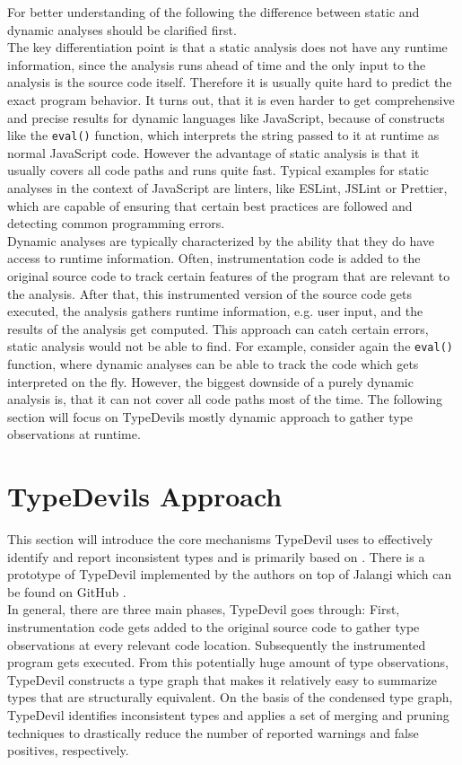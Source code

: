 \documentclass[runningheads,a4paper]{llncs}
\begin{document}
For better understanding of the following the difference between static and dynamic analyses should be clarified first.\\
The key differentiation point is that a static analysis does not have any runtime information, since the analysis runs ahead of time and the only input to the analysis is the source code itself.
Therefore it is usually quite hard to predict the exact program behavior.
It turns out, that it is even harder to get comprehensive and precise results for dynamic languages like JavaScript, because of constructs like the \lstinline[columns=fixed]{eval()} function, which interprets the string passed to it at runtime as normal JavaScript code. 
However the advantage of static analysis is that it usually covers all code paths and runs quite fast.
Typical examples for static analyses in the context of JavaScript are linters, like ESLint, JSLint or Prettier, which are capable of ensuring that certain best practices are followed and detecting common programming errors. \\
Dynamic analyses are typically characterized by the ability that they do have access to runtime information.
Often, instrumentation code is added to the original source code to track certain features of the program that are relevant to the analysis.
After that, this instrumented version of the source code gets executed, the analysis gathers runtime information, e.g. user input, and the results of the analysis get computed.
This approach can catch certain errors, static analysis would not be able to find.
For example, consider again the \lstinline[columns=fixed]{eval()} function, where dynamic analyses can be able to track the code which gets interpreted on the fly.
However, the biggest downside of a purely dynamic analysis is, that it can not cover all code paths most of the time.
The following section will focus on TypeDevils mostly dynamic approach to gather type observations at runtime.

\section{TypeDevils Approach}

This section will introduce the core mechanisms TypeDevil uses to effectively identify and report inconsistent types and is primarily based on \cite{DBLP:conf/icse/PradelSS15}.
There is a prototype of TypeDevil implemented by the authors on top of Jalangi \cite{DBLP:conf/sigsoft/SenKBG13a} which can be found on GitHub \cite{TypeDevilGitHub}.\\
In general, there are three main phases, TypeDevil goes through: 
First, instrumentation code gets added to the original source code to gather type observations at every relevant code location.
Subsequently the instrumented program gets executed.
From this potentially huge amount of type observations, TypeDevil constructs a type graph that makes it relatively easy to summarize types that are structurally equivalent.
On the basis of the condensed type graph, TypeDevil identifies inconsistent types and applies a set of merging and pruning techniques to drastically reduce the number of reported warnings and false positives, respectively.
\end{document}
